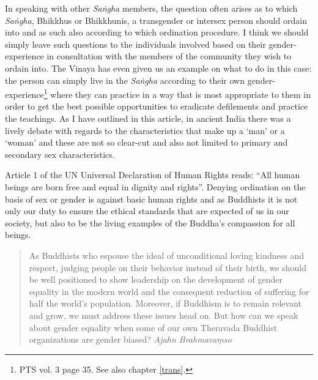 In speaking with other {\em Saṅgha} members, the question often arises as to which {\em Saṅgha}, Bhikkhus or Bhikkhunis, a transgender or intersex person should ordain into and as such also according to which ordination procedure. I think we should simply leave such questions to the individuals involved based on their gender-experience in consultation with the members of the community they wish to ordain into. The Vinaya has even given us an example on what to do in this case: the person can simply live in the {\em Saṅgha} according to their own gender-experience\footnote{PTS vol. 3 page 35. See also chapter \ref{trans}.} where they can practice in a way that is most appropriate to them in order to get the best possible opportunities to eradicate defilements and practice the teachings. As I have outlined in this article, in ancient India there was a lively debate with regards to the characteristics that make up a `man' or a `woman' and these are not so clear-cut and also not limited to primary and secondary sex characteristics.

Article 1 of the UN Universal Declaration of Human Rights reads: ``All human beings are born free and equal in dignity and rights''. Denying ordination on the basis of sex or gender is against basic human rights and as Buddhists it is not only our duty to ensure the ethical standards that are expected of us in our society, but also to be the living examples of the Buddha's compassion for all beings.

\begin{quote}
As Buddhists who espouse the ideal of unconditional loving kindness and respect, judging people on their behavior instead of their birth, we should be well positioned to show leadership on the development of gender equality in the modern world and the consequent reduction of suffering for half the world’s population. Moreover, if Buddhism is to remain relevant and grow, we must address these issues head on. But how can we speak about gender equality when some of our own Theravada Buddhist organizations are gender biased? {\em Ajahn Brahmavaṃso}
\end{quote}
